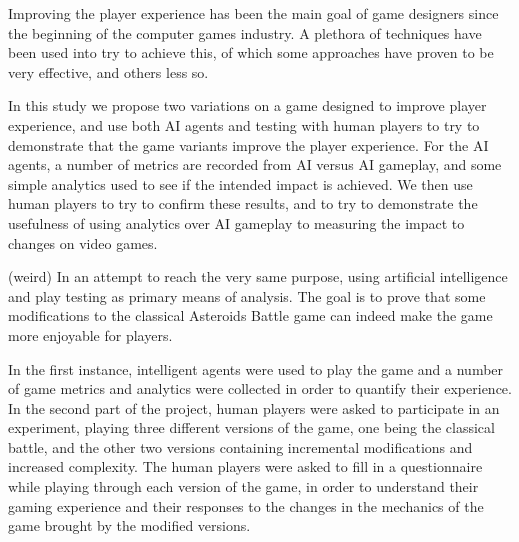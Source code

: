 Improving the player experience has been the main goal of game designers since the beginning of the computer games industry. A plethora of techniques have been used into try to achieve this, of which some approaches  have proven to be very effective, and others less so.

In this study we propose two variations on a game designed to improve player experience, and use both AI agents and testing with human players to try to demonstrate that the game variants improve the player experience. For the AI agents, a number of metrics are recorded from AI versus AI gameplay, and some simple analytics used to see if the intended impact is achieved. We then use human players to try to confirm these results, and to try to demonstrate the usefulness of using analytics over AI gameplay to measuring the impact to changes on video games.

(weird) In an attempt to reach the very same purpose, using artificial intelligence and play testing as primary means of analysis. The goal is to prove that some modifications to the classical Asteroids Battle game can indeed make the game more enjoyable for players.

In the first instance, intelligent agents were used to play the game and a number of game metrics and analytics were collected in order to quantify their experience. In the second part of the project, human players were asked to participate in an experiment, playing three different versions of the game, one being the classical battle, and the other two versions containing incremental modifications and increased complexity. The human players were asked to fill in a questionnaire while playing through each version of the game, in order to understand their gaming experience and their responses to the changes in the mechanics of the game brought by the modified versions.

